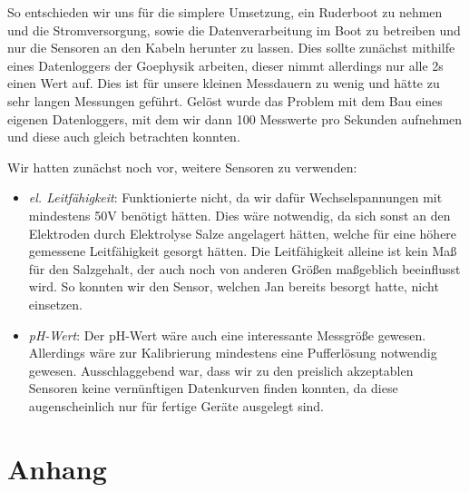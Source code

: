 \documentclass[12pt,a4paper,titlepage,headinclude,bibtotoc]{scrartcl}
\numberwithin{equation}{subsection}
\begin{document}
So entschieden wir uns für die simplere Umsetzung, ein Ruderboot zu nehmen und die Stromversorgung, sowie die Datenverarbeitung im Boot zu betreiben und nur die Sensoren an den Kabeln herunter zu lassen.
Dies sollte zunächst mithilfe eines Datenloggers der Goephysik arbeiten, dieser nimmt allerdings nur alle 2\si{\second} einen Wert auf.
Dies ist für unsere kleinen Messdauern zu wenig und hätte zu sehr langen Messungen geführt.
Gelöst wurde das Problem mit dem Bau eines eigenen Datenloggers, mit dem wir dann 100 Messwerte pro Sekunden aufnehmen und diese auch gleich betrachten konnten.


Wir hatten zunächst noch vor, weitere Sensoren zu verwenden:
\begin{itemize}
	\item \textit{el. Leitfähigkeit}: Funktionierte nicht, da wir dafür Wechselspannungen mit mindestens 50V benötigt hätten.
		Dies wäre notwendig, da sich sonst an den Elektroden durch Elektrolyse Salze angelagert hätten, welche für eine höhere gemessene Leitfähigkeit gesorgt hätten.
		Die Leitfähigkeit alleine ist kein Maß für den Salzgehalt, der auch noch von anderen Größen maßgeblich beeinflusst wird.
		So konnten wir den Sensor, welchen Jan bereits besorgt hatte, nicht einsetzen.
	\item \textit{pH-Wert}: Der pH-Wert wäre auch eine interessante Messgröße gewesen.
		Allerdings wäre zur Kalibrierung mindestens eine Pufferlösung notwendig gewesen.
		Ausschlaggebend war, dass wir zu den preislich akzeptablen Sensoren keine vernünftigen Datenkurven finden konnten, da diese augenscheinlich nur für fertige Geräte ausgelegt sind.
\end{itemize}

\newpage
\printbibliography[heading=bibintoc]
%
%
\newpage


\appendix
{}
\setcounter{page}{1}
\setcounter{footnote}{0}
\section{Anhang}
\end{document}
